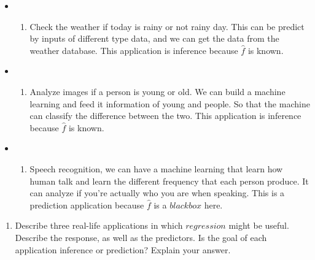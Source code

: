 \documentclass[
]{article}
\providecommand{\tightlist}{%
  \setlength{\itemsep}{0pt}\setlength{\parskip}{0pt}}
\begin{document}
\begin{itemize}
\item
  \begin{enumerate}
  \def\labelenumi{(\arabic{enumi})}
  \tightlist
  \item
    Check the weather if today is rainy or not rainy day. This can be
    predict by inputs of different type data, and we can get the data
    from the weather database. This application is inference because
    \(\hat{f}\) is known.
  \end{enumerate}
\item
  \begin{enumerate}
  \def\labelenumi{(\arabic{enumi})}
  \setcounter{enumi}{1}
  \tightlist
  \item
    Analyze images if a person is young or old. We can build a machine
    learning and feed it information of young and people. So that the
    machine can classify the difference between the two. This
    application is inference because \(\hat{f}\) is known.
  \end{enumerate}
\item
  \begin{enumerate}
  \def\labelenumi{(\arabic{enumi})}
  \setcounter{enumi}{2}
  \tightlist
  \item
    Speech recognition, we can have a machine learning that learn how
    human talk and learn the different frequency that each person
    produce. It can analyze if you're actually who you are when
    speaking. This is a prediction application because \(\hat{f}\) is a
    \(black box\) here.
  \end{enumerate}
\end{itemize}

\begin{enumerate}
\def\labelenumi{(\alph{enumi})}
\setcounter{enumi}{1}
\tightlist
\item
  Describe three real-life applications in which \(regression\) might be
  useful. Describe the response, as well as the predictors. Is the goal
  of each application inference or prediction? Explain your answer.
\end{enumerate}
\end{document}
